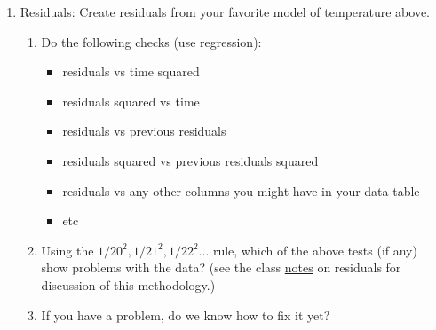 \documentclass[11pt]{article}
\begin{document}
\begin{enumerate}
\item Residuals: Create residuals from your favorite model of
temperature above.  
\begin{enumerate}
\item Do the following checks (use regression):
\begin{itemize}
\item residuals vs time squared
\item residuals squared vs time
\item residuals vs previous residuals
\item residuals squared vs previous residuals squared
\item residuals vs any other columns you might have in your data table
\item etc
\end{itemize}
\item Using the $1/20^2, 1/21^2, 1/22^2$... rule, which of the
above tests (if any) show problems with the data?  (see the class
\href{class_residuals.tex.html}{notes} on residuals for discussion of
this methodology.) 
\item If you have a problem, do we know how to fix it yet?
\end{enumerate}


\end{enumerate}
\end{document}
